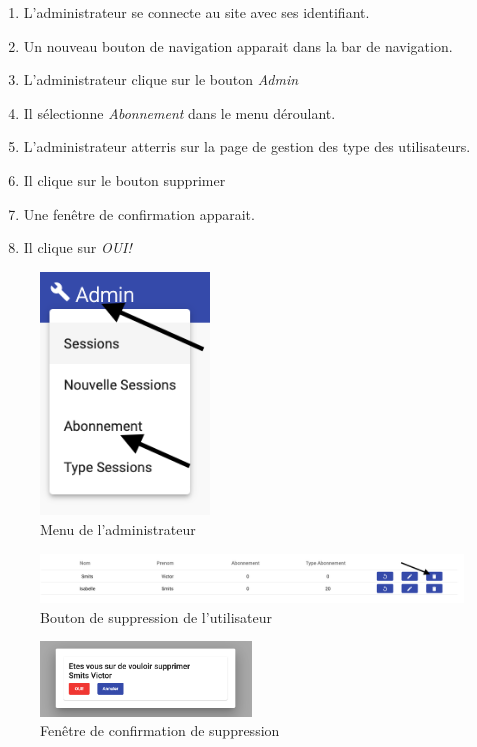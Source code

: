 \begin{enumerate}
	\item L'administrateur se connecte au site avec ses identifiant. 
	\item Un nouveau bouton de navigation apparait dans la bar de navigation. 
	\item L'administrateur clique sur le bouton \textit{Admin}
	\item Il sélectionne \textit{Abonnement} dans le menu déroulant. 
	\item L'administrateur atterris sur la page de gestion des type des utilisateurs. 
	\item Il clique sur le bouton supprimer
	\item Une fenêtre de confirmation apparait. 
	\item Il clique sur \textit{OUI!} 
\end{enumerate}

\newpage
\begin{figure}[h]
	\includegraphics[width=0.4\textwidth,center]{Figures/us15-1}
	\caption{Menu de l'administrateur}
\end{figure}

\vspace{\baselineskip}
\begin{figure}[h]
	\includegraphics[width=\textwidth,center]{Figures/us15-2}
	\caption{Bouton de suppression de l'utilisateur}
\end{figure}

\vspace{\baselineskip}
\begin{figure}[h]
	\includegraphics[width=0.5\textwidth,center]{Figures/us15-3}
	\caption{Fenêtre de confirmation de suppression}
\end{figure}

